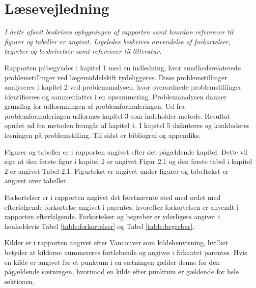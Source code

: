 \section*{Læsevejledning}
\textit{I dette afsnit beskrives opbygningen af rapporten samt hvordan referencer til figurer og tabeller er angivet. Ligeledes beskrives anvendelse af forkortelser, begreber og beskrivelser samt referencer til litteratur.}

Rapporten påbegyndes i kapitel 1 med en indledning, hvor sundhedsrelaterede problemstillinger ved lægemiddelskift tydeliggøres. Disse problemstillinger analyseres i kapitel 2 ved problemanalysen, hvor overordnede problemstillinger identificeres og sammenfattes i en opsummering. Problemanalysen danner grundlag for udformningen af problemformuleringen. Ud fra problemformuleringen udformes kapitel 3 som indeholder metode.  Resultat opnået ud fra metoden fremgår af kapitel 4. I kapitel 5 diskuteres og konkluderes løsningen på problemstilling. Til sidst er bibliograf og appendiks.

Figurer og tabeller er i rapporten angivet efter det pågældende kapitel. Dette vil sige at den første figur i kapitel 2 er angivet Figur 2.1 og den første tabel i kapitel 2 er angivet Tabel 2.1. Figurtekst er angivet under figurer og tabeltekst er angivet over tabeller. 

Forkortelser er i rapporten angivet det førstnævnte sted med ordet med efterfølgende forkortelse angivet i parentes, hvorefter forkortelsen er anvendt i rapporten efterfølgende. Forkortelser og begreber er yderligere angivet i henholdsvis Tabel \ref{table:forkortelser} og Tabel \ref{table:begreber}.

Kilder er i rapporten angivet efter Vancouver som kildehenvisning, hvilket betyder at kilderne nummereres fortløbende og angives i firkantet parentes. Hvis en kilde er angivet før et punktum i en sætningen gælder denne for den pågældende sætningen, hvorimod en kilde efter punktum er gældende for hele sektionen.


